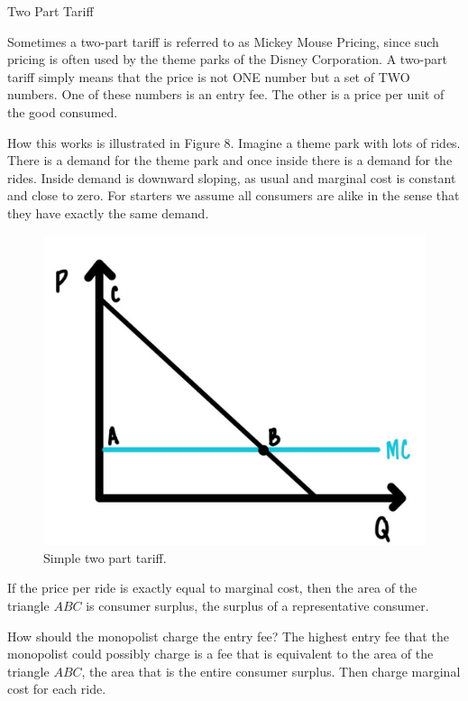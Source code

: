\documentclass[
]{book}
\begin{document}
\begin{center}
Two Part Tariff

\end{center}

Sometimes a two-part tariff is referred to as Mickey Mouse Pricing, since such pricing is often used by the theme parks of the Disney Corporation. A two-part tariff simply means that the price is not ONE number but a set of TWO numbers. One of these numbers is an entry fee. The other is a price per unit of the good consumed.

How this works is illustrated in Figure 8. Imagine a theme park with lots of rides. There is a demand for the theme park and once inside there is a demand for the rides. Inside demand is downward sloping, as usual and marginal cost is constant and close to zero. For starters we assume all consumers are alike in the sense that they have exactly the same demand.

\begin{figure}

{\centering \includegraphics[width=0.75\linewidth]{img/ch6/fig9} 

}

\caption{Simple two part tariff.}\label{fig:fig609}
\end{figure}

If the price per ride is exactly equal to marginal cost, then the area of the triangle \(ABC\) is consumer surplus, the surplus of a representative consumer.

How should the monopolist charge the entry fee? The highest entry fee that the monopolist could possibly charge is a fee that is equivalent to the area of the triangle \(ABC\), the area that is the entire consumer surplus. Then charge marginal cost for each ride.
\end{document}
